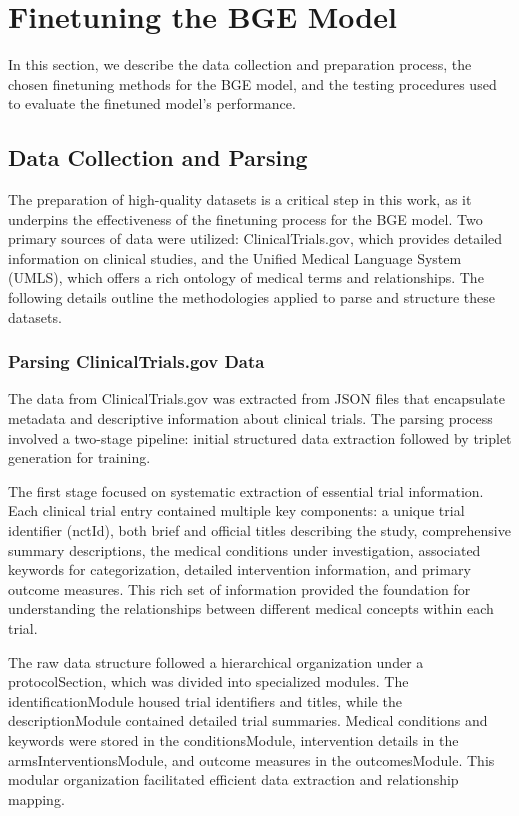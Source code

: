 \section{Finetuning the BGE Model}
\label{sec:finetuning_bge}

In this section, we describe the data collection and preparation process, the chosen finetuning methods for the BGE model, and the testing procedures used to evaluate the finetuned model's performance.



\subsection{Data Collection and Parsing}
\label{subsec:data_collection}

The preparation of high-quality datasets is a critical step in this work, as it underpins the effectiveness of the finetuning process for the BGE model. Two primary sources of data were utilized: ClinicalTrials.gov, which provides detailed information on clinical studies, and the Unified Medical Language System (UMLS), which offers a rich ontology of medical terms and relationships. The following details outline the methodologies applied to parse and structure these datasets.

\subsubsection{Parsing ClinicalTrials.gov Data}
\label{subsubsec:parsing_clinical_trials}

The data from ClinicalTrials.gov was extracted from JSON files that encapsulate metadata and descriptive information about clinical trials. The parsing process involved a two-stage pipeline: initial structured data extraction followed by triplet generation for training.

The first stage focused on systematic extraction of essential trial information. Each clinical trial entry contained multiple key components: a unique trial identifier (nctId), both brief and official titles describing the study, comprehensive summary descriptions, the medical conditions under investigation, associated keywords for categorization, detailed intervention information, and primary outcome measures. This rich set of information provided the foundation for understanding the relationships between different medical concepts within each trial.

The raw data structure followed a hierarchical organization under a protocolSection, which was divided into specialized modules. The identificationModule housed trial identifiers and titles, while the descriptionModule contained detailed trial summaries. Medical conditions and keywords were stored in the conditionsModule, intervention details in the armsInterventionsModule, and outcome measures in the outcomesModule. This modular organization facilitated efficient data extraction and relationship mapping.

